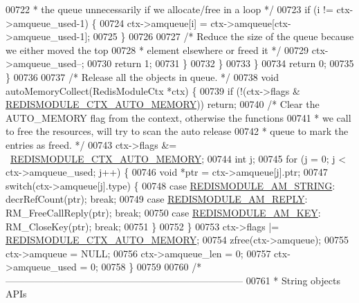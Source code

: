 \begin{DoxyCode}
{00722 \textcolor{comment}{                 * the queue unnecessarily if we allocate/free in a loop */}
00723                 \textcolor{keywordflow}{if} (i != ctx->amqueue\_used-1) \{
00724                     ctx->amqueue[i] = ctx->amqueue[ctx->amqueue\_used-1];
00725                 \}
00726 
00727                 \textcolor{comment}{/* Reduce the size of the queue because we either moved the top}
00728 \textcolor{comment}{                 * element elsewhere or freed it */}
00729                 ctx->amqueue\_used--;
00730                 \textcolor{keywordflow}{return} 1;
00731             \}
00732         \}
00733     \}
00734     \textcolor{keywordflow}{return} 0;
00735 \}
00736 
00737 \textcolor{comment}{/* Release all the objects in queue. */}
00738 \textcolor{keywordtype}{void} autoMemoryCollect(RedisModuleCtx *ctx) \{
00739     \textcolor{keywordflow}{if} (!(ctx->flags & \hyperlink{module_8c_a223998b47b49203e12aba298a7a8fd14}{REDISMODULE\_CTX\_AUTO\_MEMORY})) \textcolor{keywordflow}{return};
00740     \textcolor{comment}{/* Clear the AUTO\_MEMORY flag from the context, otherwise the functions}
00741 \textcolor{comment}{     * we call to free the resources, will try to scan the auto release}
00742 \textcolor{comment}{     * queue to mark the entries as freed. */}
00743     ctx->flags &= ~\hyperlink{module_8c_a223998b47b49203e12aba298a7a8fd14}{REDISMODULE\_CTX\_AUTO\_MEMORY};
00744     \textcolor{keywordtype}{int} j;
00745     \textcolor{keywordflow}{for} (j = 0; j < ctx->amqueue\_used; j++) \{
00746         \textcolor{keywordtype}{void} *ptr = ctx->amqueue[j].ptr;
00747         \textcolor{keywordflow}{switch}(ctx->amqueue[j].type) \{
00748         \textcolor{keywordflow}{case} \hyperlink{module_8c_a566ace39ef8d3d16c3f7d9d6c6b8e4ef}{REDISMODULE\_AM\_STRING}: decrRefCount(ptr); \textcolor{keywordflow}{break};
00749         \textcolor{keywordflow}{case} \hyperlink{module_8c_a3a23ca3942d52889333fbd34f6efcffe}{REDISMODULE\_AM\_REPLY}: RM\_FreeCallReply(ptr); \textcolor{keywordflow}{break};
00750         \textcolor{keywordflow}{case} \hyperlink{module_8c_a72f72d8bccf7f1b34e5622b3571c2fe5}{REDISMODULE\_AM\_KEY}: RM\_CloseKey(ptr); \textcolor{keywordflow}{break};
00751         \}
00752     \}
00753     ctx->flags |= \hyperlink{module_8c_a223998b47b49203e12aba298a7a8fd14}{REDISMODULE\_CTX\_AUTO\_MEMORY};
00754     zfree(ctx->amqueue);
00755     ctx->amqueue = NULL;
00756     ctx->amqueue\_len = 0;
00757     ctx->amqueue\_used = 0;
00758 \}
00759 
00760 \textcolor{comment}{/* --------------------------------------------------------------------------}
00761 \textcolor{comment}{ * String objects APIs}
}
\end{DoxyCode}
